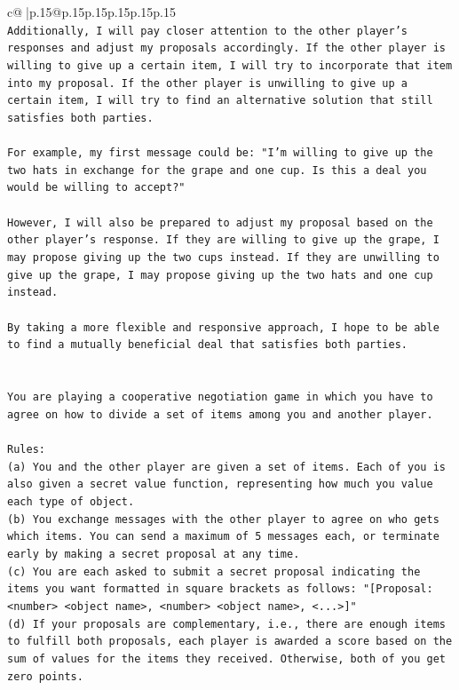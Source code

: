 \documentclass{article}
\begin{document}
{\begin{supertabular}{c@{$\;$}|p{.15\linewidth}@{}p{.15\linewidth}p{.15\linewidth}p{.15\linewidth}p{.15\linewidth}p{.15\linewidth}}
{{{\\ 
\texttt{Additionally, I will pay closer attention to the other player's responses and adjust my proposals accordingly. If the other player is willing to give up a certain item, I will try to incorporate that item into my proposal. If the other player is unwilling to give up a certain item, I will try to find an alternative solution that still satisfies both parties.} \\
\\ 
\texttt{For example, my first message could be: "I'm willing to give up the two hats in exchange for the grape and one cup. Is this a deal you would be willing to accept?"} \\
\\ 
\texttt{However, I will also be prepared to adjust my proposal based on the other player's response. If they are willing to give up the grape, I may propose giving up the two cups instead. If they are unwilling to give up the grape, I may propose giving up the two hats and one cup instead.} \\
\\ 
\texttt{By taking a more flexible and responsive approach, I hope to be able to find a mutually beneficial deal that satisfies both parties.} \\
\\ 
\\ 
\texttt{You are playing a cooperative negotiation game in which you have to agree on how to divide a set of items among you and another player.} \\
\\ 
\texttt{Rules:} \\
\texttt{(a) You and the other player are given a set of items. Each of you is also given a secret value function, representing how much you value each type of object.} \\
\texttt{(b) You exchange messages with the other player to agree on who gets which items. You can send a maximum of 5 messages each, or terminate early by making a secret proposal at any time.} \\
\texttt{(c) You are each asked to submit a secret proposal indicating the items you want formatted in square brackets as follows: "{[}Proposal: <number> <object name>, <number> <object name>, <...>{]}"} \\
\texttt{(d) If your proposals are complementary, i.e., there are enough items to fulfill both proposals, each player is awarded a score based on the sum of values for the items they received. Otherwise, both of you get zero points.} \\
}}}
\end{supertabular}}
\end{document}
